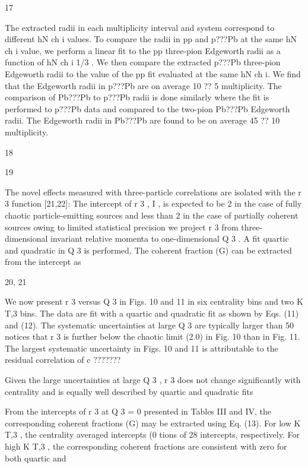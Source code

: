 17

The extracted radii in each multiplicity interval and system correspond to different hN ch i values.
To compare the radii in pp and p???Pb at the same hN ch i value, we perform a linear fit to the
pp three-pion Edgeworth radii as a function of hN ch i 1/3 . We then compare the extracted p???Pb
three-pion Edgeworth radii to the value of the pp fit evaluated at the same hN ch i. We find that the
Edgeworth radii in p???Pb are on average 10 ?? 5%
multiplicity. The comparison of Pb???Pb to p???Pb radii is done similarly where the fit is performed
to p???Pb data and compared to the two-pion Pb???Pb Edgeworth radii. The Edgeworth radii in
Pb???Pb are found to be on average 45 ?? 10%
multiplicity.

18

19

The novel effects measured with three-particle correlations are isolated with the r 3 function [21,22]:
The intercept of r 3 , I , is
expected to be 2 in the case of fully chaotic particle-emitting
sources and less than 2 in the case of partially coherent sources
owing to limited statistical
precision we project r 3 from three-dimensional invariant
relative momenta to one-dimensional Q 3 . A fit quartic and
quadratic in Q 3 is performed,
The coherent
fraction (G) can be extracted from the intercept as

20, 21

We now present r 3 versus Q 3 in Figs. 10 and 11 in six
centrality bins and two K T,3 bins. The data are fit with a
quartic and quadratic fit as shown by Eqs. (11) and (12). The
systematic uncertainties at large Q 3 are typically larger than
50%
notices that r 3 is further below the chaotic limit (2.0) in Fig. 10
than in Fig. 11.
The largest systematic uncertainty in Figs. 10 and 11 is
attributable to the residual correlation of c ???????

Given the large uncertainties at large Q 3 , r 3 does not change
significantly with centrality and is equally well described by
quartic and quadratic fits

From the intercepts of r 3 at Q 3 = 0 presented in Tables III
and IV, the corresponding coherent fractions (G) may be
extracted using Eq. (13). For low K T,3 , the centrality averaged
intercepts (0%
tions of 28%
intercepts, respectively. For high K T,3 , the corresponding
coherent fractions are consistent with zero for both quartic and

